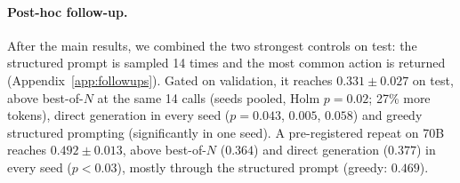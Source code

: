 \paragraph{Post-hoc follow-up.}
After the main results, we combined the two strongest controls on test: the structured prompt is sampled
14 times and the most common action is returned (Appendix~\ref{app:followups}). Gated on validation, it reaches $0.331 \pm 0.027$ on test, above best-of-$N$ at the same 14 calls (seeds pooled, Holm $p = 0.02$; 27\% more tokens), direct generation in every seed ($p = 0.043$, $0.005$, $0.058$) and greedy structured prompting (significantly in one seed). A pre-registered repeat on 70B reaches $0.492 \pm 0.013$, above best-of-$N$ ($0.364$) and direct generation ($0.377$) in every seed ($p < 0.03$), mostly through the structured prompt (greedy: $0.469$).
